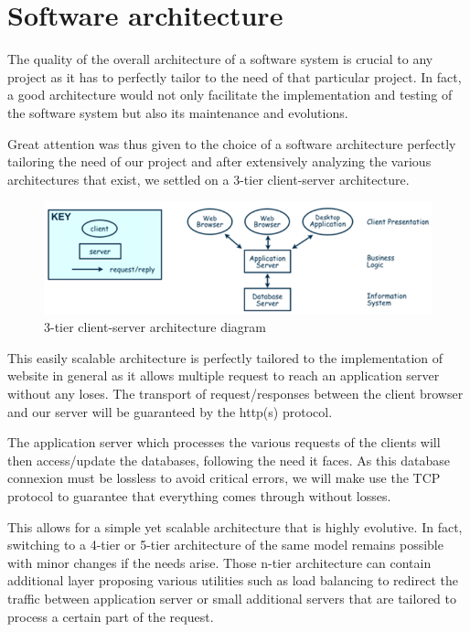 \section{Software architecture}

The quality of the overall architecture of a software system is crucial to
any project as it has to perfectly tailor to the need of that particular
project. In fact, a good architecture would not only facilitate the
implementation and testing of the software system but also its maintenance
and evolutions.\newline

Great attention was thus given to the choice of a software architecture
perfectly tailoring the need of our project and after extensively analyzing
the various architectures that exist, we settled on a 3-tier client-server
architecture. \newline

\begin{figure}[H]
	\centering
	\includegraphics[width=0.8\linewidth]{ClientServerArchitecture.png}
	\caption{3-tier client-server architecture diagram}
    \label{djangoclientserver}
\end{figure}

This easily scalable architecture is perfectly tailored to the
implementation of website in general as it allows multiple request to reach
an application server without any loses. The transport of request/responses
between the client browser and our server will be guaranteed by the http(s)
protocol. \newline

The application server which processes the various requests of the clients
will then access/update the databases, following the need it faces. As this
database connexion must be lossless to avoid critical errors, we will make
use the TCP protocol to guarantee that everything comes through without
losses. \newline

This allows for a simple yet scalable architecture that is highly evolutive.
In fact, switching to a 4-tier or 5-tier architecture of the same model
remains possible with minor changes if the needs arise. Those n-tier
architecture can contain additional layer proposing various utilities such
as load balancing to redirect the traffic between application server or
small additional servers that are tailored to process a certain part of the
request. \newline

